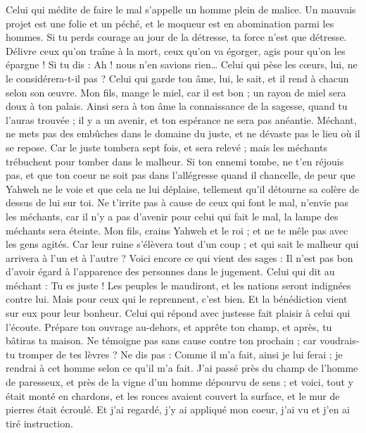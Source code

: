 \begin{multicols}{2}
Celui qui médite de faire le mal s’appelle un homme plein de malice.
Un mauvais projet est une folie et un péché, et le moqueur est en abomination parmi les hommes.
Si tu perds courage au jour de la détresse, ta force n'est que détresse.
Délivre ceux qu’on traîne à la mort, ceux qu’on va égorger, agis pour qu’on les épargne !
Si tu dis : Ah ! nous n’en savions rien… Celui qui pèse les cœurs, lui, ne le considérera-t-il pas ? Celui qui garde ton âme, lui, le sait, et il rend à chacun selon son œuvre.
Mon fils, mange le miel, car il est bon ; un rayon de miel sera doux à ton palais.
Ainsi sera à ton âme la connaissance de la sagesse, quand tu l'auras trouvée ; il y a un avenir, et ton espérance ne sera pas anéantie.
Méchant, ne mets pas des embûches dans le domaine du juste, et ne dévaste pas le lieu où il se repose.
Car le juste tombera sept fois, et sera relevé ; mais les méchants trébuchent pour tomber dans le malheur.
Si ton ennemi tombe, ne t'en réjouis pas, et que ton coeur ne soit pas dans l’allégresse quand il chancelle,
de peur que Yahweh ne le voie et que cela ne lui déplaise, tellement qu'il détourne sa colère de dessus de lui sur toi.
Ne t’irrite pas à cause de ceux qui font le mal, n'envie pas les méchants,
car il n'y a pas d’avenir pour celui qui fait le mal, la lampe des méchants sera éteinte.
Mon fils, crains Yahweh et le roi ; et ne te mêle pas avec les gens agités.
Car leur ruine s'élèvera tout d'un coup ; et qui sait le malheur qui arrivera à l’un et à l’autre ?
Voici encore ce qui vient des sages : Il n'est pas bon d'avoir égard à l'apparence des personnes dans le jugement.
Celui qui dit au méchant : Tu es juste ! Les peuples le maudiront, et les nations seront indignées contre lui.
Mais pour ceux qui le reprennent, c’est bien. Et la bénédiction vient sur eux pour leur bonheur.
Celui qui répond avec justesse fait plaisir à celui qui l'écoute.
Prépare ton ouvrage au-dehors, et apprête ton champ, et après, tu bâtiras ta maison.
Ne témoigne pas sans cause contre ton prochain ; car voudrais-tu tromper de tes lèvres ?
Ne dis pas : Comme il m'a fait, ainsi je lui ferai ; je rendrai à cet homme selon ce qu'il m'a fait.
J'ai passé près du champ de l'homme de paresseux, et près de la vigne d'un homme dépourvu de sens ;
et voici,  tout y était monté en chardons, et les ronces avaient couvert la surface, et le mur de pierres était écroulé.
Et j’ai regardé, j’y ai appliqué mon coeur, j’ai vu et j’en ai tiré instruction.

\end{multicols}
